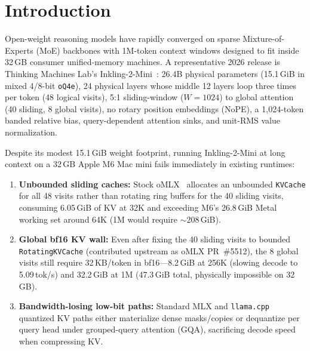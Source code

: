\documentclass[conference]{IEEEtran}
\begin{document}
\section{Introduction}
\label{sec:intro}

Open-weight reasoning models have rapidly converged on sparse Mixture-of-Experts (MoE) backbones with 1M-token context windows designed to fit inside 32\,GB consumer unified-memory machines. A representative 2026 release is Thinking Machines Lab's Inkling-2-Mini~\cite{inkling2mini2026}: 26.4B physical parameters (15.1\,GiB in mixed 4/8-bit \texttt{oQ4e}), 24 physical layers whose middle 12 layers loop three times per token (48 logical visits), 5:1 sliding-window ($W=1024$) to global attention (40 sliding, 8 global visits), no rotary position embeddings (NoPE), a 1{,}024-token banded relative bias, query-dependent attention sinks, and unit-RMS value normalization.

Despite its modest 15.1\,GiB weight footprint, running Inkling-2-Mini at long context on a 32\,GB Apple M6 Mac mini fails immediately in existing runtimes:
\begin{enumerate}
    \item \textbf{Unbounded sliding caches:} Stock oMLX~\cite{omlx2026} allocates an unbounded \texttt{KVCache} for all 48 visits rather than rotating ring buffers for the 40 sliding visits, consuming 6.05\,GiB of KV at 32K and exceeding M6's 26.8\,GiB Metal working set around 64K (1M would require $\sim$208\,GiB).
    \item \textbf{Global bf16 KV wall:} Even after fixing the 40 sliding visits to bounded \texttt{RotatingKVCache} (contributed upstream as oMLX PR~\#5512), the 8 global visits still require 32\,KB/token in bf16—8.2\,GiB at 256K (slowing decode to 5.09\,tok/s) and 32.2\,GiB at 1M (47.3\,GiB total, physically impossible on 32\,GB).
    \item \textbf{Bandwidth-losing low-bit paths:} Standard MLX and \texttt{llama.cpp} quantized KV paths either materialize dense masks/copies or dequantize per query head under grouped-query attention (GQA), sacrificing decode speed when compressing KV.
\end{enumerate}
\end{document}
